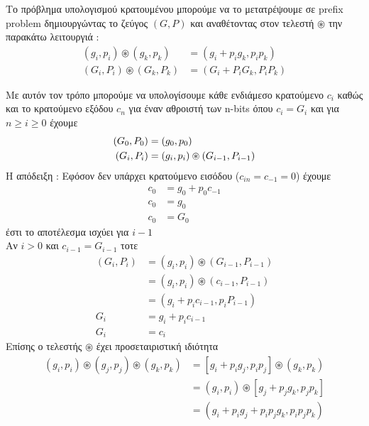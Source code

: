 Το πρόβλημα υπολογισμού κρατουμένου μπορούμε να το μετατρέψουμε σε
prefix problem δημιουργώντας το ζεύγος $(G,P)$ και αναθέτοντας στον τελεστή
$\circledast$ την παρακάτω λειτουργιά :
\begin{equation}
\begin{split}
(g_i,p_i) \circledast (g_k,p_k) &= (g_i + p_ig_k , p_ip_k)\\
(G_i,P_i) \circledast (G_k,P_k) &= (G_i + P_iG_k , P_iP_k)
\end{split}
\end{equation}

Με αυτόν τον τρόπο μπορούμε να υπολογίσουμε κάθε ενδιάμεσο κρατούμενο $c_i$
καθώς και το κρατούμενο εξόδου $c_n$ για έναν αθροιστή των n-bits όπου $c_i = G_i$
και για $n \geq i \geq 0$ έχουμε 
\begin{equation}
\equationame{Αλγεβρικός ορισμός των $(G_i,P_i)$}
\begin{split}
(G_0,P_0) &= (g_0,p_0)\\
(G_i,P_i) &= (g_i,p_i) \circledast (G_{i-1},P_{i-1})
\end{split}
\end{equation}
Η απόδειξη :
Εφόσον δεν υπάρχει κρατούμενο εισόδου ($c_{in} = c_{-1} = 0$) έχουμε 
\begin{equation*}
\begin{split}
    c_0 &= g_0 + p_0c_{-1} \\
    c_0 &= g_0 \\
    c_0 &= G_0
\end{split}
\end{equation*}
έστι το αποτέλεσμα ισχύει για $i-1$ \\
Αν $i>0$ και $c_{i-1} = G_{i-1}$ τοτε
\begin{equation*}
\begin{split} 
    (G_i,P_i)   &= (g_i,p_i) \circledast (G_{i-1},P_{i-1}) \\
                &= (g_i,p_i) \circledast (c_{i-1},P_{i-1}) \\
                &= (g_i + p_ic_{i-1} , p_iP_{i-1}) \\
            G_i &= g_i + p_ic_{i-1} \\
            G_i &= c_i
\end{split}
\end{equation*}
Επίσης ο τελεστής $\circledast$ έχει προσεταιριστική ιδιότητα 
\begin{equation*}
\begin{split} 
    (g_i,p_i)\circledast(g_j,p_j)\circledast(g_k,p_k) &= [g_i + p_ig_j,p_ip_j]\circledast(g_k,p_k) \\
    &= (g_i,p_i)\circledast[g_j + p_jg_k,p_jp_k]\\
    &= ( g_i + p_ig_j + p_ip_jg_k , p_ip_jp_k )
\end{split}
\end{equation*}

